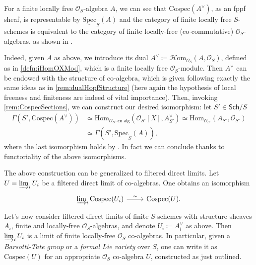 \begin{rem}[]
	For a finite locally free $\mathcal{O}_{ S }$-algebra $A$,
	we can see that $\mathrm{Cospec}(A^{\vee})$, as an fppf sheaf, is representable 
	by $\underline{\mathrm{Spec}}_S(A)$ and
	the category of finite locally free $S$-schemes
	is equivalent to the category of finite locally-free (co-commutative)
	$\mathcal{O}_{ S }$-algebras, as shown in 
	\cite[Chapter III, remark 2.1.2]{Messing}.

	Indeed, given $A$ as above, we introduce its dual
	$A^{\vee} \coloneqq \mathcal{H}\mathrm{om}_{\mathcal{O}_{ S }} \left( A, \mathcal{O}_{ S } \right)$,
	defined as in \cref{defn:iHomOXMod}, which is a
	finite locally free $\mathcal{O}_{ S }$-module.
	Then $A^{\vee}$ can be endowed with the structure of co-algebra, which is
	given following exactly the same ideas as in \cref{rem:dualHopfStructure}
	(here again the hypothesis of local freeness and finiteness are indeed
	of vital importance).
	Then, invoking \cref{rem:CospecSections}, we can construct 
	our desired isomorphism: let $S' \in \mathsf{Sch}/S$
	\begin{align*}
		\Gamma(S', \mathrm{Cospec}(A^{\vee})) &\simeq
		\mathrm{Hom}_{ \mathcal{O}_{ S' }\text{-}\mathsf{co}\text{-}\mathsf{alg}} 
		\left( \mathcal{O}_{ S' }[X], A^\vee_{S'} \right) \simeq
		\mathrm{Hom}_{ \mathcal{O}_{ S' }}
		\left( A_{S'}, \mathcal{O}_{ S' } \right) \\
		&\simeq
		\Gamma(S', \underline{\mathrm{Spec}}_S(A))
	,\end{align*}
	where the last isomorphism holds by 
	\cite[\href{https://stacks.math.columbia.edu/tag/01LV}{Lemma 01LV}]{SP}.
	In fact we can conclude thanks to functoriality of the above isomorphisms.
\end{rem}


\begin{rem}
	The above construction can be generalized to
	filtered direct limits.
	Let $U = \varinjlim_i U_i$ be a filtered direct limit
	of co-algebras. One obtains an isomorphism
	\begin{equation*}
	\begin{tikzcd}[row sep = 0ex
		,/tikz/column 1/.append style={anchor=base east}
		,/tikz/column 2/.append style={anchor=base west}]
		\varinjlim_i \mathrm{Cospec}(U_i) \arrow[r, "\sim", rightarrow] &
		\mathrm{Cospec}(U)
	.\end{tikzcd}
	\end{equation*} 
	Let's now consider filtered direct limits of 
	finite $S$-schemes with structure sheaves $A_i$,
	finite and locally-free $\mathcal{O}_{ S }$-algebras, 
	and denote $U_i \coloneqq A_i^\vee$ as above.
	Then $\varinjlim_i U_i$ is a limit 
	of finite locally-free $\mathcal{O}_{ S }$ co-algebras.
	In particular, given a {\em Barsotti-Tate group} or a {\em formal Lie variety}
	over $S$, one can write it as $\mathrm{Cospec}(U)$ for an appropriate 
	$\mathcal{O}_{ S }$ co-algebra $U$, constructed as just outlined.
\end{rem}


